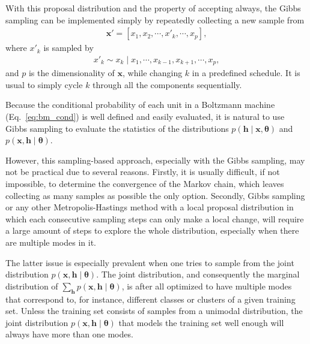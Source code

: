 \documentclass[dissertation,nocontribution,draft*]{aaltoseries}
\newcommand{\vect}[1]{\mathbf{#1}}
\newcommand{\vects}[1]{\boldsymbol{#1}}
\newcommand{\vh}[0]{\vect{h}}
\newcommand{\vx}[0]{\vect{x}}
\newcommand{\TT}[0]{{\vects{\theta}}}
\begin{document}
With this proposal distribution and the property of
accepting always, the Gibbs sampling can be implemented
simply by repeatedly collecting a new sample from
\begin{align*}
    \vx' = \left[ x_1, x_2, \cdots,
    x'_k, \cdots, x_p \right],
\end{align*}
where $x'_k$ is sampled by
\begin{align*}
    x'_k \sim x_k \mid x_1, \cdots, x_{k-1},
    x_{k+1}, \cdots, x_p,
\end{align*}
and $p$ is the dimensionality of $\vx$, while changing $k$
in a predefined schedule. It is usual to simply cycle $k$
through all the components sequentially.

Because the conditional probability of each unit in a
Boltzmann machine (Eq.~\eqref{eq:bm_cond}) is well defined
and easily evaluated, it is natural to use Gibbs
sampling to evaluate the statistics of the distributions
$p(\vh \mid \vx, \TT)$ and $p(\vx, \vh \mid \TT)$. 

However, this sampling-based approach, especially with the
Gibbs sampling, may not be practical due to several reasons.
Firstly, it is usually difficult, if not impossible, to
determine the convergence of the Markov chain, which leaves
collecting as many samples as possible the only option.
Secondly, Gibbs sampling or any other
Metropolis-Hastings method with a local proposal
distribution in which each consecutive sampling steps can
only make a local change, will require a large amount of
steps to
explore the whole distribution, especially when there are multiple modes
in it. 

The latter issue is especially prevalent when one tries to sample
from the joint distribution $p(\vx, \vh \mid \TT)$.  The
joint distribution, and consequently the marginal
distribution of $\sum_{\vh} p(\vx, \vh \mid \TT)$, is after
all optimized to have multiple modes that correspond to,
for instance, different classes or clusters of a given
training set. Unless the training set consists of samples
from a unimodal distribution, the joint distribution $p(\vx,
\vh \mid \TT)$ that models the training set well enough will
always have more than one modes.


\end{document}
